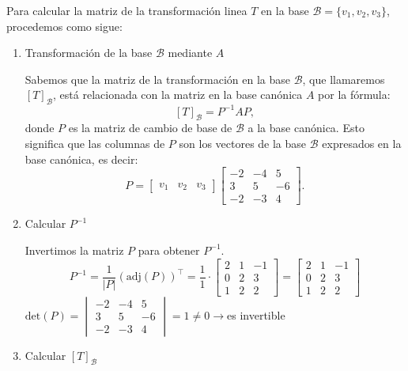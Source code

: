 \begin{enumerate}[label=\color{red}\textbf{\arabic*)}]
Para calcular la matriz de la transformación linea $T$ en la base $\mathcal{B}=\{v_1,v_2,v_3\} $, procedemos como sigue:
\begin{enumerate}[label=Paso \arabic*:]
    \item Transformación de la base $\mathcal{B}$ mediante $A$

        Sabemos que la matriz de la transformación en la base  $\mathcal{B}$, que llamaremos $[T]_{\mathcal{B}}$, está relacionada con la matriz en la base canónica $A$ por la fórmula: \[
            [T]_{\mathcal{B}}=P^{-1}AP,
        \]donde $P$ es la matriz de cambio de base de $\mathcal{B}$ a la base canónica. Esto significa que las columnas de $P$ son los vectores de la base $\mathcal{B}$ expresados en la base canónica, es decir: \[
        P=\begin{bmatrix} 
            v_1 & v_2 & v_3 
        \end{bmatrix}\begin{bmatrix} 
            -2 & -4 & 5\\
            3 & 5 & -6\\
            -2 & -3 & 4
        \end{bmatrix}. 
        \] 
    \item Calcular $P^{-1}$

        Invertimos la matriz $P$ para obtener $P^{-1}$. \[
        P^{-1}=\dfrac{1}{|P|}(\mathrm{adj}(P))^\intercal=\dfrac{1}{1}\cdot \begin{bmatrix} 
            2 & 1 & -1\\
            0 & 2 & 3\\
            1 & 2 & 2
        \end{bmatrix}=\begin{bmatrix} 
            2 & 1 & -1\\
            0 & 2 & 3\\
            1 & 2 & 2
        \end{bmatrix}  
        \] 
        $\mathrm{det}(P)=\begin{vmatrix} 
            -2 & -4 & 5\\
            3 & 5 & -6\\
            -2 & -3 & 4
        \end{vmatrix}=1\neq 0 \to $es invertible
    \item Calcular $[T]_{\mathcal{B}}$


\end{enumerate}
\end{enumerate}
